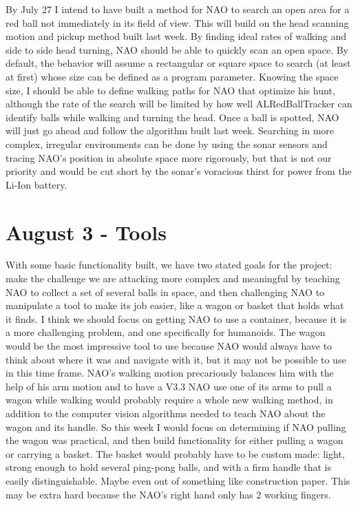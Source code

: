 \documentclass[12pt]{report}
\begin{document}
\indent
By July 27 I intend to have built a method for NAO to search an open area for a red ball not immediately in its field of view.  This will build on the head
scanning motion and pickup method built last week.  By finding ideal rates of walking and side to side head turning, NAO should be able to 
quickly scan an open space.  By default, the behavior will assume a rectangular or square space to search (at least at first) whose size can be 
defined as a program parameter.  Knowing the space size, I should be able to define walking paths for NAO that optimize his hunt, although the
rate of the search will be limited by how well ALRedBallTracker can identify balls while walking and turning the head.  Once a ball is spotted,
NAO will just go ahead and follow the algorithm built last week.  Searching in more complex, irregular environments can be done by using the sonar 
sensors and tracing NAO's position in absolute space  more rigorously, but that is not our priority and would be cut short by the sonar's voracious thirst
for power from the Li-Ion battery.


\section{August 3 - Tools}

\indent
With some basic functionality built, we have two stated goals for the project: make the challenge we are attacking more complex and meaningful by 
teaching NAO to collect a set of several balls in space, and then challenging NAO to manipulate a tool to make its job easier, like a wagon
or basket that holds what it finds.  I think we should focus on getting NAO to use a container, because it is a more challenging
problem, and one specifically for humanoids.  The wagon would be the most impressive tool to use because NAO would always have to think about where it
was and navigate with it, but it may not be possible to use in this time frame.  NAO's walking motion precariously balances him with the help of his 
arm motion and to have a V3.3 NAO use one of its arms to pull a wagon while walking would probably require a whole new walking method, in addition 
to the computer vision algorithms needed to teach NAO about the wagon and its handle.  So this week I would focus on determining if NAO pulling the wagon
was practical, and then build functionality for either pulling a wagon or carrying a basket.  The basket would probably have to be custom made:
light, strong enough to hold several ping-pong balls, and with a firm handle that is easily distinguishable.  Maybe even out of something like construction
paper.  This may be extra hard because the NAO's right hand only has 2 working fingers.
\end{document}
